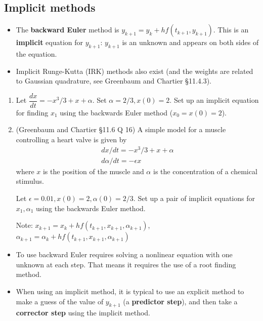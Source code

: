 \documentclass[12pt,letterpaper,noanswers]{exam}
\begin{document}
\subsection*{Implicit methods}
\begin{tcolorbox}
\begin{itemize}
\itemsep0pt
    \item The \textbf{backward Euler} method is $y_{k+1} = y_k + hf(t_{k+1},y_{k+1})$.  This is an \textbf{implicit} equation for $y_{k+1}$: $y_{k+1}$ is an unknown and appears on both sides of the equation.
    \item Implicit Runge-Kutta (IRK) methods also exist (and the weights are related to Gaussian quadrature, see Greenbaum and Chartier \S 11.4.3).
\end{itemize}
\end{tcolorbox}

\begin{enumerate}[resume=classQ]
\item Let $\dfrac{dx}{dt} = -x^3/3 + x + \alpha$.  Set $\alpha = 2/3, x(0) = 2$.  Set up an implicit equation for finding $x_1$ using the backwards Euler method ($x_0 = x(0) = 2$).
\vspace{1in}
\item (Greenbaum and Chartier \S 11.6 Q 16) A simple model for a muscle controlling a heart valve is given by \[\displaystyle\begin{array}{l} dx/dt = -x^3/3 + x + \alpha \\
d\alpha/dt= -\epsilon x \end{array}\]
where $x$ is the position of the muscle and $\alpha$ is the concentration of a chemical stimulus.

Let $\epsilon = 0.01, x(0) = 2, \alpha(0) = 2/3$.  Set up a pair of implicit equations for $x_1, \alpha_1$ using the backwards Euler method.  

Note: $x_{k+1} = x_k + hf(t_{k+1},x_{k+1},\alpha_{k+1})$, $\alpha_{k+1} = \alpha_k + hf(t_{k+1},x_{k+1},\alpha_{k+1})$ 
\vspace{1in}
\end{enumerate}
\begin{tcolorbox}
\begin{itemize}\itemsep0pt
        \item To use backward Euler requires solving a nonlinear equation with one unknown at each step.  That means it requires the use of a root finding method.
    \item When using an implicit method, it is typical to use an explicit method to make a guess of the value of $y_{k+1}$ (a \textbf{predictor step}), and then take a \textbf{corrector step} using the implicit method.
\end{itemize}
\end{tcolorbox}
\end{document}
